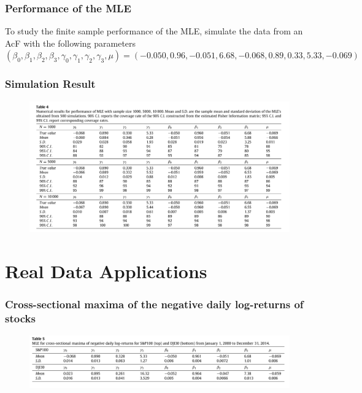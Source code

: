 \documentclass{beamer}
\begin{document}
\begin{frame}
    \frametitle{Performance of the MLE}
 To study the finite sample performance of the MLE, simulate the data from an AcF with the following parameters $(\beta_0,\beta_1,\beta_2,\beta_3,\gamma_0,\gamma_1,\gamma_2,\gamma_3,\mu)=(-0.050,0.96,-0.051,6.68,-0.068,0.89,0.33,5.33,-0.069)$

\end{frame}

\begin{frame}
    \frametitle{Simulation Result}
\begin{figure}
    \includegraphics[width=1\textwidth]{table4.png}
\end{figure}
    

\end{frame}


\section{Real Data Applications}



\begin{frame}
    \frametitle{Cross-sectional maxima of the negative daily log-returns of stocks}

    \begin{figure}
        \includegraphics[width=1\textwidth]{table5.png}
    \end{figure}

\end{frame}
\end{document}
